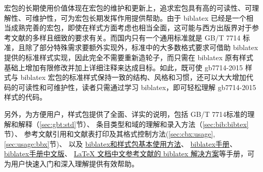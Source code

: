 \documentclass[11pt]{article} %
\begin{document}
\begin{enumerate}
宏包的长期使用价值体现在宏包的维护和更新上，追求宏包具有高的可读性、可理解性、可维护性，可为宏包长期发挥作用提供帮助。由于 biblatex 已经是一个相当成熟完善的宏包，即使在样式方面考虑也相当全面，这可能与西方出版界对于参考文献的多样且细致的要求有关。而国内只有一个通用标准就是 GB/T 7714 标准，且除了部分特殊需求要额外实现外，标准中的大多数格式要求可借助 biblatex 提供的标准样式实现，因此完全不需要重新造轮子，而只需在 biblatex 原有样式基础上增加有限修改并加上详细注释来达成目标。如此，既可使 gb7714-2015 样式与 biblatex 宏包的标准样式保持一致的结构、风格和习惯，还可以大大增加代码的可读性和可维护性，读者只需通过学习 biblatex，即可轻松理解 gb7714-2015 样式的代码。


另外，为方便用户，样式包提供了全面、详实的说明，包括
GB/T 7714标准的理解和解释（\ref{sec:gbt:std}节）、
条目类型和域的理解和录入方法（\ref{sec:bib:bibtex}节）、
参考文献引用和文献表打印及其格式控制方法(\ref{sec:cbx:usage},\ref{sec:usage:bbx}节)、
\hypertarget{lab:manual:hyper}{以及}
\href{https://github.com/hushidong/biblatex-gb7714-2015/wiki}{biblatex和样式包基本使用方法}、
\href{https://github.com/plk/biblatex}{biblatex手册}、
\href{https://github.com/hushidong/biblatex-zh-cn}{biblatex手册中文版}、
\href{https://github.com/hushidong/biblatex-solution-to-latex-bibliography}{LaTeX 文档中文参考文献的 biblatex 解决方案}等手册，可为用户快速入门和深入理解提供有效帮助。

\end{enumerate}

\end{document}
